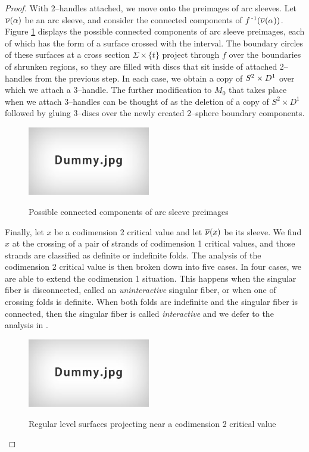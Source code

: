 \begin{proof}
	With 2--handles attached, we move onto the preimages of arc sleeves.
	Let $\overline{\nu}(\alpha)$ be an arc sleeve, and consider the connected components of $f^{\,\text{-}1}(\overline{\nu}(\alpha))$.
	Figure \ref{fig:arcsleevepre} displays the possible connected components of arc sleeve preimages, each of which has the form of a surface crossed with the interval.
	The boundary circles of these surfaces at a cross section $\Sigma\times\{t\}$ project through $f$ over the boundaries of shrunken regions, so they are filled with discs that sit inside of attached 2--handles from the previous step.
	In each case, we obtain a copy of $S^2\times D^1$ over which we attach a 3--handle.
	The further modification to $M_0$ that takes place when we attach 3--handles can be thought of as the deletion of a copy of $S^2\times D^1$ followed by gluing 3--discs over the newly created 2--sphere boundary components.
	
	\begin{figure}
		\centering
		\captionsetup{justification=centering}
		\caption{Possible connected components of arc sleeve preimages}
		\includegraphics[height=3cm]{figures/dummy.jpg}
		\label{fig:arcsleevepre}
	\end{figure}
	
	Finally, let $x$ be a codimension 2 critical value and let $\overline{\nu}(x)$ be its sleeve.
	We find $x$ at the crossing of a pair of strands of codimension 1 critical values, and those strands are classified as definite or indefinite folds.
	The analysis of the codimension 2 critical value is then broken down into five cases.
	In four cases, we are able to extend the codimension 1 situation.
	This happens when the singular fiber is disconnected, called an \emph{uninteractive} singular fiber, or when one of crossing folds is definite.
	When both folds are indefinite and the singular fiber is connected, then the singular fiber is called \emph{interactive} and we defer to the analysis in \cite{CostThur08}.
	
	\begin{figure}
		\centering
		\captionsetup{justification=centering}
		\caption{Regular level surfaces projecting near a codimension 2 critical value}
		\includegraphics[height=3cm]{figures/dummy.jpg}
		\label{fig:regprojcodim2}
	\end{figure}
	

\end{proof}
